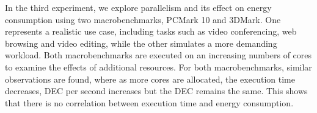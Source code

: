 In the third experiment, we explore parallelism and its effect on energy consumption using two macrobenchmarks, PCMark 10 and 3DMark. One represents a realistic use case, including tasks such as video conferencing, web browsing and video editing, while the other simulates a more demanding workload. Both macrobenchmarks are executed on an increasing numbers of cores to examine the effects of additional resources. For both macrobenchmarks, similar observations are found, where as more cores are allocated, the execution time decreases, DEC per second increases but the DEC remains the same. This shows that there is no correlation between execution time and energy consumption. 

